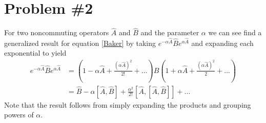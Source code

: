 \documentclass[11pt]{article}
\numberwithin{equation}{section}
\begin{document}
\section{Problem \#2}
For two noncommuting operators $\hat{A}$ and $\hat{B}$ and the parameter $\alpha$ we can see find a generalized 
result for equation \ref{Baker} by taking $e^{-\alpha\hat{A}}\hat{B}e^{\alpha\hat{A}}$ and expanding each exponential
to yield
\begin{align*}
    e^{-\alpha\hat{A}}\hat{B}e^{\alpha\hat{A}} &= \left(1-\alpha\hat{A}+\frac{(\alpha\hat{A})^2}{2!}+...\right)\hat{B}\left(1+\alpha\hat{A}+\frac{(\alpha\hat{A})^2}{2}+...\right)\\
                                               &= \hat{B} - \alpha[\hat{A},\hat{B}] + \frac{\alpha^2}{2!}[\hat{A},[\hat{A},\hat{B}]] + ...
\end{align*}
Note that the result follows from simply expanding the products and grouping powers of $\alpha$.
\end{document}
